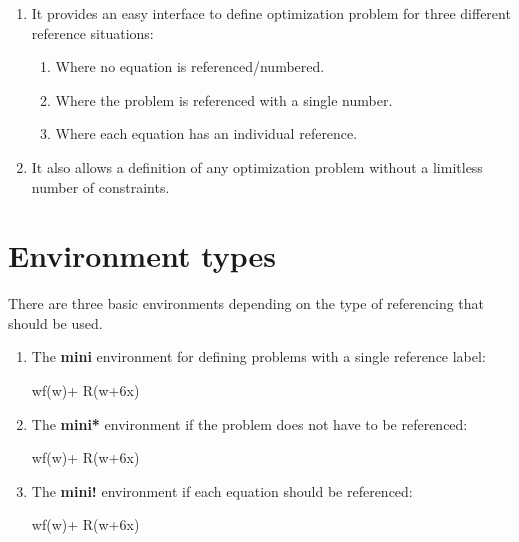 \documentclass[]{report}
\begin{document}
\begin{enumerate}
\item It provides an easy interface to define optimization problem for three different reference situations:
\begin{enumerate}
	\item Where no equation is referenced/numbered.
	\item Where the problem is referenced with a single number.
	\item Where each equation has an individual reference.
\end{enumerate} 

\item It also allows a definition of any optimization problem without a limitless number of constraints.

\end{enumerate}
\section{Environment types}
There are three basic environments depending on the type of referencing that should be used.
\begin{enumerate}
	\item The \textbf{mini} environment for defining problems with a single reference label:
		\begin{mini}
			{w}{f(w)+ R(w+6x)}
			{\label{eq:Ex1}}{}
		\end{mini}
	\item The \textbf{mini*} environment if the problem does not have to be referenced:
			\begin{mini*}
				{w}{f(w)+ R(w+6x)}
				{}{}
			\end{mini*}
	\item  The \textbf{mini!} environment if each equation should be referenced:
			\begin{mini!}
				{w}{f(w)+ R(w+6x)\label{eq:Ex2}}
				{\label{eq:Ex1}}{}
			\end{mini!}		
\end{enumerate}
\end{document}
